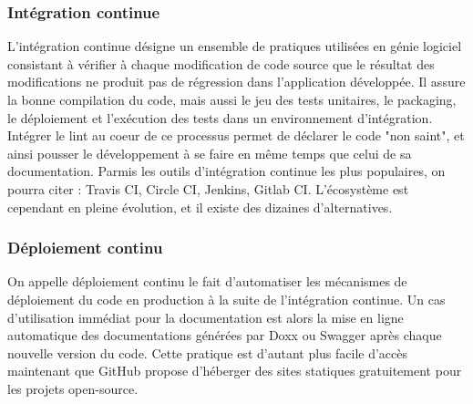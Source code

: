     \subsubsection{Intégration continue}
        L'intégration continue désigne un ensemble de pratiques utilisées en génie logiciel consistant
        à vérifier à chaque modification de code source que le résultat des modifications ne produit
        pas de régression dans l'application développée. Il assure la bonne compilation du code,
        mais aussi le jeu des tests unitaires, le packaging, le déploiement et l’exécution des tests
        dans un environnement d’intégration. Intégrer le lint au coeur de ce processus permet
        de déclarer le code "non saint", et ainsi pousser le développement à se faire en même
        temps que celui de sa documentation. Parmis les outils d'intégration continue les plus
        populaires, on pourra citer : Travis CI, Circle CI, Jenkins, Gitlab CI. L'écosystème est cependant
        en pleine évolution, et il existe des dizaines d'alternatives.

    \subsubsection{Déploiement continu}
        On appelle déploiement continu le fait d'automatiser les mécanismes de déploiement du code en
        production à la suite de l'intégration continue. Un cas d'utilisation immédiat pour la documentation
        est alors la mise en ligne automatique des documentations générées par Doxx ou Swagger après
        chaque nouvelle version du code. Cette pratique est d'autant plus facile d'accès maintenant que
        GitHub propose d'héberger des sites statiques gratuitement pour les projets open-source.